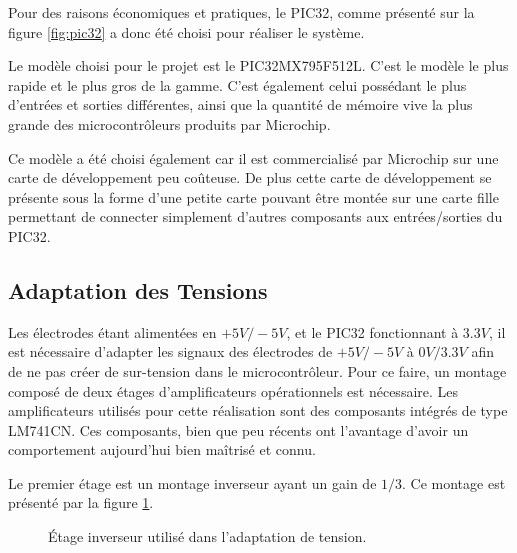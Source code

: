 \documentclass[letterpaper, twoside, 12pt, memoire, creativecommons, hyperref]{thETS}
\begin{document}
Pour des raisons économiques et pratiques, le PIC32, comme présenté sur la figure \ref{fig:pic32} a donc été choisi pour réaliser le système.
 
Le modèle choisi pour le projet est le PIC32MX795F512L. C'est le modèle le plus rapide et le plus gros de la gamme. C'est également celui possédant le plus d'entrées et sorties différentes, ainsi que la quantité de mémoire vive la plus grande des microcontrôleurs produits par Microchip.

Ce modèle a été choisi également car il est commercialisé par Microchip sur une carte de développement peu coûteuse. De plus cette carte de développement se présente sous la forme d'une petite carte pouvant être montée sur une carte fille permettant de connecter simplement d'autres composants aux entrées/sorties du PIC32. 


\subsection{Adaptation des Tensions}

Les électrodes étant alimentées en $+5V/-5V$, et le PIC32 fonctionnant à $3.3V$, il est nécessaire d’adapter les signaux des électrodes de $+5V/-5V$ à $0V/3.3V$ afin de ne pas créer de sur-tension dans le microcontrôleur. Pour ce faire, un montage composé de deux étages d'amplificateurs opérationnels est nécessaire.  Les amplificateurs utilisés pour cette réalisation sont des composants intégrés de type LM741CN. Ces composants, bien que peu récents ont l'avantage d'avoir un comportement aujourd'hui bien maîtrisé et connu. 

Le premier étage est un montage inverseur ayant un gain de $1/3$. Ce montage est présenté par la figure \ref{fig:inverseur}.

\begin{figure}
	\centering
	\caption{Étage inverseur utilisé dans l'adaptation de tension.}
	\label{fig:inverseur}
\end{figure}
\end{document}

